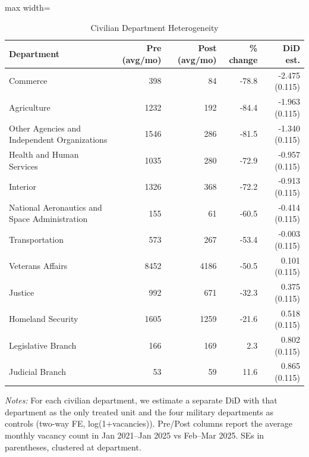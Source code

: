 \begin{table}[!ht]
\centering
\caption{Civilian Department Heterogeneity}
\label{tab:dept}
\footnotesize
\begin{adjustbox}{max width=\textwidth}
\begin{tabular}{lrrrr}
\toprule
Department & Pre (avg/mo) & Post (avg/mo) & \% change & DiD est. \\
\midrule
Commerce & 398 & 84 & -78.8 & -2.475 (0.115) \\
Agriculture & 1232 & 192 & -84.4 & -1.963 (0.115) \\
Other Agencies and Independent Organizations & 1546 & 286 & -81.5 & -1.340 (0.115) \\
Health and Human Services & 1035 & 280 & -72.9 & -0.957 (0.115) \\
Interior & 1326 & 368 & -72.2 & -0.913 (0.115) \\
National Aeronautics and Space Administration & 155 & 61 & -60.5 & -0.414 (0.115) \\
Transportation & 573 & 267 & -53.4 & -0.003 (0.115) \\
Veterans Affairs & 8452 & 4186 & -50.5 & 0.101 (0.115) \\
Justice & 992 & 671 & -32.3 & 0.375 (0.115) \\
Homeland Security & 1605 & 1259 & -21.6 & 0.518 (0.115) \\
Legislative Branch & 166 & 169 & 2.3 & 0.802 (0.115) \\
Judicial Branch & 53 & 59 & 11.6 & 0.865 (0.115) \\
\bottomrule
\end{tabular}
\end{adjustbox}
\begin{minipage}{0.92\textwidth}
\footnotesize\textit{Notes:} For each civilian department, we estimate a separate DiD with that department as the only treated unit and the four military departments as controls (two-way FE, log(1+vacancies)). Pre/Post columns report the average monthly vacancy count in Jan 2021--Jan 2025 vs Feb--Mar 2025. SEs in parentheses, clustered at department.
\end{minipage}
\end{table}
